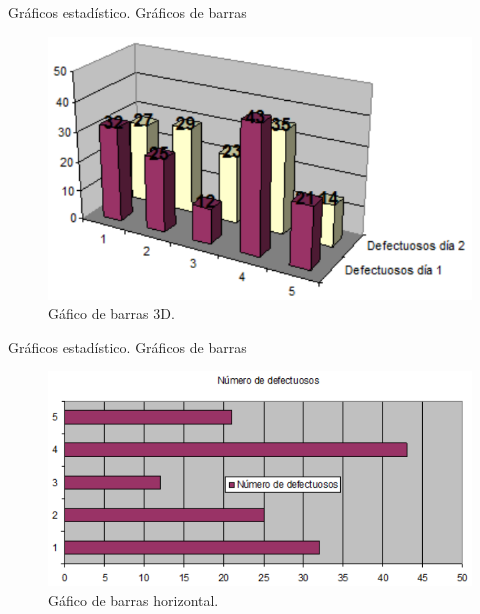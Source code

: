 \documentclass[11pt]{beamer}
\begin{document}
      \begin{frame}{Gráficos estadístico. Gráficos de barras}

        \begin{figure}
          \centering
          \includegraphics[width=0.7\linewidth]{images/graficos_barra2}
          \caption{Gáfico de barras 3D.}
          \label{fig:graficosbarra2}
        \end{figure}
      \end{frame}


      \begin{frame}{Gráficos estadístico. Gráficos de barras}
        \begin{figure}
          \centering
          \includegraphics[width=0.7\linewidth]{images/graficos_barra3}
          \caption{Gáfico de barras horizontal.}
          \label{fig:graficosbarra3}
        \end{figure}
      \end{frame}
\end{document}
